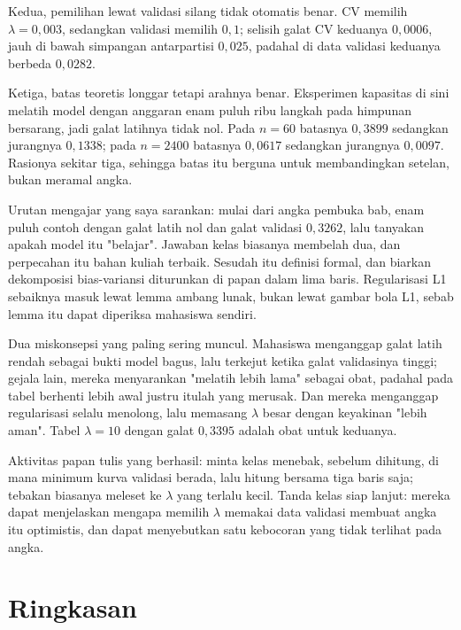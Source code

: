 Kedua, pemilihan lewat validasi silang tidak otomatis benar. CV memilih
$\lambda=0{,}003$, sedangkan validasi memilih $0{,}1$; selisih galat CV keduanya
$0{,}0006$, jauh di bawah simpangan antarpartisi $0{,}025$, padahal di data validasi
keduanya berbeda $0{,}0282$.

Ketiga, batas teoretis longgar tetapi arahnya benar. Eksperimen kapasitas di sini
melatih model dengan anggaran enam puluh ribu langkah pada himpunan bersarang, jadi galat
latihnya tidak nol. Pada $n=60$ batasnya $0{,}3899$ sedangkan jurangnya $0{,}1338$; pada
$n=2400$ batasnya $0{,}0617$ sedangkan jurangnya $0{,}0097$. Rasionya sekitar tiga,
sehingga batas itu berguna untuk membandingkan setelan, bukan meramal angka.

\begin{untukdosen}
Urutan mengajar yang saya sarankan: mulai dari angka pembuka bab, enam puluh contoh
dengan galat latih nol dan galat validasi $0{,}3262$, lalu tanyakan apakah model itu
"belajar". Jawaban kelas biasanya membelah dua, dan perpecahan itu bahan kuliah terbaik.
Sesudah itu definisi formal, dan biarkan dekomposisi bias-variansi diturunkan di papan
dalam lima baris. Regularisasi L1 sebaiknya masuk lewat lemma ambang lunak, bukan lewat
gambar bola L1, sebab lemma itu dapat diperiksa mahasiswa sendiri.

Dua miskonsepsi yang paling sering muncul. Mahasiswa menganggap galat latih rendah sebagai
bukti model bagus, lalu terkejut ketika galat validasinya tinggi; gejala lain, mereka
menyarankan "melatih lebih lama" sebagai obat, padahal pada tabel berhenti lebih awal
justru itulah yang merusak. Dan mereka menganggap regularisasi selalu menolong, lalu
memasang $\lambda$ besar dengan keyakinan "lebih aman". Tabel $\lambda=10$ dengan galat
$0{,}3395$ adalah obat untuk keduanya.

Aktivitas papan tulis yang berhasil: minta kelas menebak, sebelum dihitung, di mana
minimum kurva validasi berada, lalu hitung bersama tiga baris saja; tebakan biasanya
meleset ke $\lambda$ yang terlalu kecil. Tanda kelas siap lanjut: mereka dapat menjelaskan
mengapa memilih $\lambda$ memakai data validasi membuat angka itu optimistis, dan dapat
menyebutkan satu kebocoran yang tidak terlihat pada angka.
\end{untukdosen}

\section{Ringkasan}

